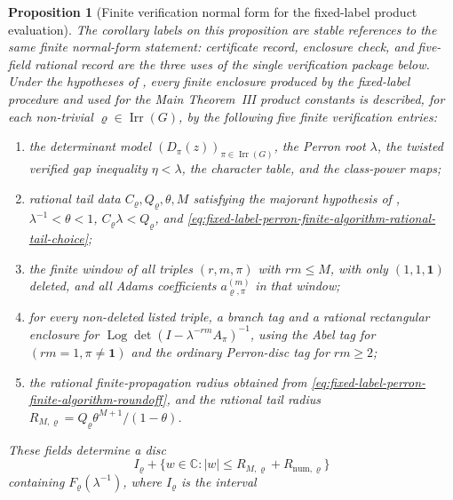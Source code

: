 \documentclass[11pt,a4paper]{amsart}
\theoremstyle{plain}
\newtheorem{proposition}[theorem]{Proposition}
\theoremstyle{definition}
\theoremstyle{remark}
\DeclareMathOperator{\Irr}{Irr}
\DeclareMathOperator{\Log}{Log}
\newcommand{\CC}{\mathbb{C}}
\begin{document}
\begin{proposition}[Finite verification normal form for the fixed-label product evaluation]\label{prop:fixed-label-certificate-normal-form}
\label{cor:fixed-label-product-certificate-record}
\label{cor:fixed-label-product-enclosure-check}
\label{cor:fixed-label-five-field-rational-record}
  The corollary labels on this proposition are stable references to the same
  finite normal-form statement: certificate record, enclosure check, and
  five-field rational record are the three uses of the single verification
  package below.
  Under the hypotheses of , every finite
  enclosure produced by the fixed-label procedure and used for the
  Main Theorem~III product constants is described, for each non-trivial
  \(\varrho\in\Irr(G)\), by the following five finite verification entries:
  \begin{enumerate}[label=\textup{(\roman*)},leftmargin=*]
    \item the determinant model
      \((D_\pi(z))_{\pi\in\Irr(G)}\), the Perron root \(\lambda\), the twisted
      verified gap inequality \(\eta<\lambda\), the character table, and the
      class-power maps;
    \item rational tail data \(C_\varrho,Q_\varrho,\theta,M\) satisfying the
      majorant hypothesis of ,
      \(\lambda^{-1}<\theta<1\), \(C_\varrho\lambda<Q_\varrho\), and
      \eqref{eq:fixed-label-perron-finite-algorithm-rational-tail-choice};
    \item the finite window of all triples \((r,m,\pi)\) with \(rm\le M\), with
      only \((1,1,\mathbf1)\) deleted, and all Adams coefficients
      \(a_{\varrho,\pi}^{(m)}\) in that window;
    \item for every non-deleted listed triple, a branch tag and a rational
      rectangular enclosure for
      \(\Log\det(I-\lambda^{-rm}A_\pi)^{-1}\), using the Abel tag for
      \((rm=1,\pi\ne\mathbf1)\) and the ordinary Perron-disc tag for
      \(rm\ge2\);
    \item the rational finite-propagation radius obtained from
      \eqref{eq:fixed-label-perron-finite-algorithm-roundoff}, and the rational
      tail radius \(R_{M,\varrho}=Q_\varrho\theta^{M+1}/(1-\theta)\).
  \end{enumerate}
  These fields determine a disc
  \[
    I_\varrho+
    \{w\in\CC:|w|\le R_{M,\varrho}+R_{\mathrm{num},\varrho}\}
  \]
  containing \(F_\varrho(\lambda^{-1})\), where \(I_\varrho\) is the interval

\end{proposition}
\end{document}

